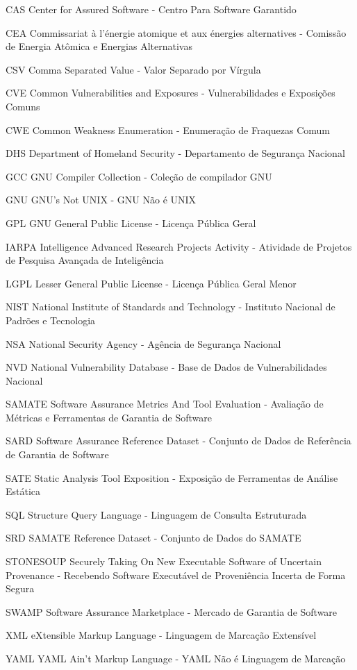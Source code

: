 \begin{siglas}
  \item[CAS] Center for Assured Software - Centro Para Software Garantido
  \item[CEA] Commissariat à l'énergie atomique et aux énergies alternatives - Comissão de Energia Atômica e Energias Alternativas
  \item[CSV] Comma Separated Value - Valor Separado por Vírgula
  \item[CVE] Common Vulnerabilities and Exposures - Vulnerabilidades e Exposições Comuns
  \item[CWE] Common Weakness Enumeration - Enumeração de Fraquezas Comum
  \item[DHS] Department of Homeland Security - Departamento de Segurança Nacional
  \item[GCC] GNU Compiler Collection - Coleção de compilador GNU
  \item[GNU] GNU's Not UNIX - GNU Não é UNIX
  \item[GPL] GNU General Public License - Licença Pública Geral
  \item[IARPA] Intelligence Advanced Research Projects Activity - Atividade de Projetos de Pesquisa Avançada de Inteligência
  \item[LGPL] Lesser General Public License - Licença Pública Geral Menor
  \item[NIST] National Institute of Standards and Technology - Instituto Nacional de Padrões e Tecnologia
  \item[NSA] National Security Agency - Agência de Segurança Nacional
  \item[NVD] National Vulnerability Database - Base de Dados de Vulnerabilidades Nacional
  \item[SAMATE] Software Assurance Metrics And Tool Evaluation - Avaliação de Métricas e Ferramentas de Garantia de Software
  \item[SARD] Software Assurance Reference Dataset - Conjunto de Dados de Referência de Garantia de Software
  \item[SATE] Static Analysis Tool Exposition - Exposição de Ferramentas de Análise Estática
  \item[SQL] Structure Query Language - Linguagem de Consulta Estruturada
  \item[SRD] SAMATE Reference Dataset - Conjunto de Dados do SAMATE
  \item[STONESOUP] Securely Taking On New Executable Software of Uncertain Provenance - Recebendo Software Executável de Proveniência Incerta de Forma Segura
  \item[SWAMP] Software Assurance Marketplace - Mercado de Garantia de Software
  \item[XML] eXtensible Markup Language - Linguagem de Marcação Extensível
  \item[YAML] YAML Ain't Markup Language - YAML Não é Linguagem de Marcação
\end{siglas}
